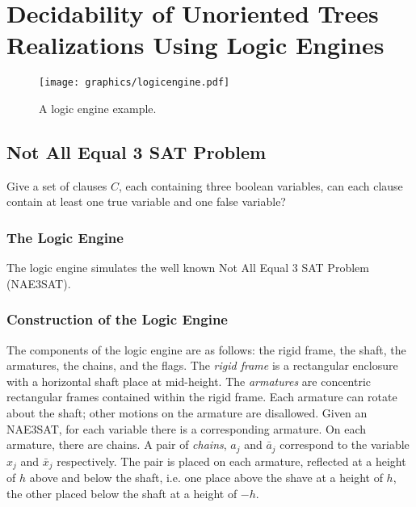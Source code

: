 
\chapter{Decidability of Unoriented Trees Realizations Using Logic Engines}
\begin{figure}[!htbp]
\begin{center}
\texttt{[image: graphics/logicengine.pdf]}
\caption{A logic engine example.}\label{fig:logicengine-1}
\end{center}
\end{figure}
\section{Not All Equal 3 SAT Problem}
\begin{prob}\label{prob:Satisfiability-2}%
Give a set of clauses $C$, each containing three boolean variables, can each clause contain at
least one true variable and one false variable?
\end{prob}
\subsection{The Logic Engine}
The logic engine simulates the well known Not All Equal 3 SAT Problem (NAE3SAT).
\subsection{Construction of the Logic Engine}
The components of the logic engine are as follows: the rigid frame, the shaft, the armatures,
the chains, and the flags.  The \textit{rigid frame} is a rectangular enclosure with a horizontal
shaft place at mid-height.  The \textit{armatures} are concentric rectangular frames contained
within the rigid frame.  Each armature can rotate about the shaft; other motions on the armature
are disallowed.  Given an NAE3SAT, for each variable there is a corresponding armature. On each
armature, there are chains.  A pair of \textit{chains}, $a_j$ and $\bar{a}_j$ correspond to the
variable $x_j$ and $\bar{x}_j$ respectively.  The pair is placed on each armature, reflected at a
height of $h$ above and below the shaft, i.e. one place above the shave at a height of $h$, the
other placed below the shaft at a height of $-h$.

